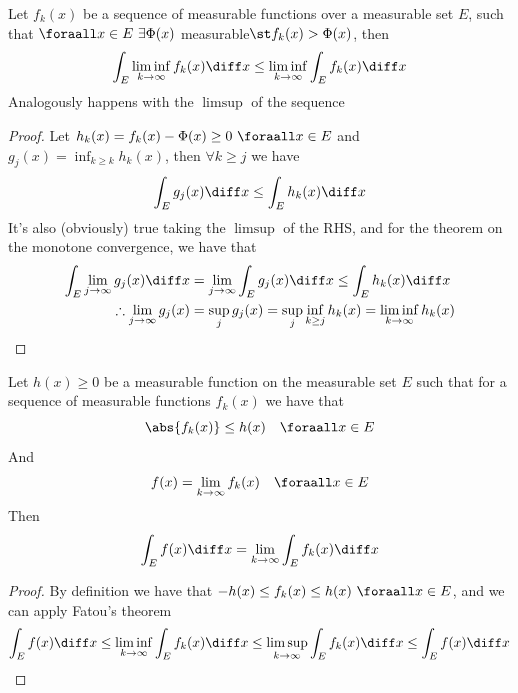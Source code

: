 \documentclass[../mmf.tex]{subfiles}
\begin{document}
\begin{thm}[Fatou]
	Let $f_k(x)$ be a sequence of measurable functions over a measurable set $E$, such that $\foraall x\in E\ \exists\Phi(x)$ measurable$\st f_k(x)>\Phi(x)$, then
	\begin{equation*}
		\int_{E}^{}\liminf_{k\to\infty}f_k(x)\diff x\le\liminf_{k\to\infty}\int_{E}^{}f_k(x)\diff x
	\end{equation*}
	Analogously happens with the $\limsup$ of the sequence
\end{thm}
\begin{proof}
	Let $h_k(x)=f_k(x)-\Phi(x)\ge0\ \foraall x\in E$ and $g_j(x)=\inf_{k\ge k}h_k(x)$, then $\forall k\ge j$ we have
	\begin{equation*}
		\int_{E}^{}g_j(x)\diff x\le\int_{E}^{}h_k(x)\diff x
	\end{equation*}
	It's also (obviously) true taking the $\limsup$ of the RHS, and for the theorem on the monotone convergence, we have that
	\begin{equation*}
		\begin{aligned}
			\int_{E}^{}\lim_{j\to\infty}g_j(x)\diff x&=\lim_{j\to\infty}\int_{E}^{}g_j(x)\diff x\le\int_{E}^{}h_k(x)\diff x\\
			\therefore\lim_{j\to\infty}g_j(x)&= \sup_jg_j(x)=\sup_j\inf_{k\ge j}h_k(x)=\liminf_{k\to\infty}h_k(x)
		\end{aligned}
	\end{equation*}
\end{proof}
\begin{thm}
	Let $h(x)\ge0$ be a measurable function on the measurable set $E$ such that for a sequence of measurable functions $f_k(x)$ we have that
	\begin{equation*}
		\abs{f_k(x)}\le h(x)\quad\foraall x\in E
	\end{equation*}
	And
	\begin{equation*}
		f(x)=\lim_{k\to\infty}f_k(x)\quad\foraall x\in E
	\end{equation*}
	Then
	\begin{equation*}
		\int_{E}^{}f(x)\diff x=\lim_{k\to\infty}\int_{E}^{}f_k(x)\diff x
	\end{equation*}
	\label{thm:domcon}
\end{thm}
\begin{proof}
	By definition we have that $-h(x)\le f_k(x)\le h(x)\ \foraall x\in E$, and we can apply Fatou's theorem
	\begin{equation*}
		\int_{E}^{}f(x)\diff x\le\liminf_{k\to\infty}\int_{E}^{}f_k(x)\diff x\le\limsup_{k\to\infty}\int_{E}^{}f_k(x)\diff x\le\int_{E}^{}f(x)\diff x
	\end{equation*}
\end{proof}
\end{document}
